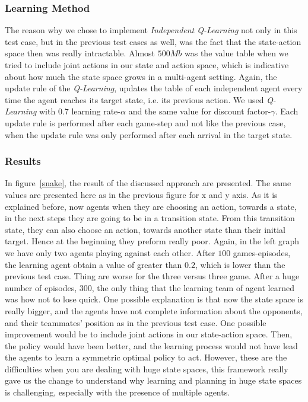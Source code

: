 \documentclass[conference]{IEEEtran}
\begin{document}
\subsubsection{Learning Method}
The reason why we chose to implement \textit{Independent Q-Learning} not only in this test case, but in the previous test cases as well, was the fact that the state-action space then was really intractable. Almost $500Mb$ was the value table when we tried to include joint actions in our state and action space, which is indicative about how much the state space grows in a multi-agent setting.
Again, the update rule of the \textit{Q-Learning}, updates the table of each independent agent every time the agent reaches its target state, i.e. its previous action. We used \textit{Q-Learning} with $0.7$ learning rate-$\alpha$ and the same value for discount factor-$\gamma$. Each update rule is performed after each game-step and not like the previous case, when the update rule was only performed after each arrival in the target state.
\subsubsection{Results}
In figure~\ref{snake}, the result of the discussed approach are presented. The same values are presented here as in the previous figure for x and y axis. As it is explained before, now agents when they are choosing an action, towards a state, in the next steps they are going to be in a transition state. From this transition state, they can also choose an action, towards another state than their initial target. Hence at the beginning they preform really poor. Again, in the left graph we have only two agents playing against each other. After $100$ games-episodes, the learning agent obtain a value of greater than $0.2$, which is lower than the previous test case. Thing are worse for the three versus three game. After a huge number of episodes, $300$, the only thing that the learning team of agent learned was how not to lose quick. One possible explanation is that now the state space is really bigger, and the agents have not complete information about the opponents, and their teammates' position as in the previous test case. One possible improvement would be to include joint actions in our state-action space. Then, the policy would have been better, and the learning process would not have lead the agents to learn a symmetric optimal policy to act. However, these are the difficulties when you are dealing with huge state spaces, this framework really gave us the change to understand why learning and planning in huge state spaces is challenging, especially with the presence of multiple agents.


\subsection{}

\newpage
\printbibliography 
\end{document}

